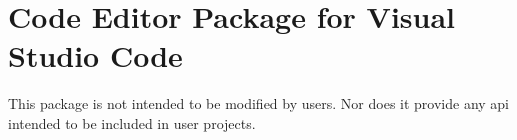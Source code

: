 \chapter{Code Editor Package for Visual Studio Code}
\hypertarget{md__library_2_package_cache_2com_8unity_8ide_8vscode_0d1_82_85_2_documentation_0i_2_r_e_a_d_m_e}{}\label{md__library_2_package_cache_2com_8unity_8ide_8vscode_0d1_82_85_2_documentation_0i_2_r_e_a_d_m_e}
\label{md__library_2_package_cache_2com_8unity_8ide_8vscode_0d1_82_85_2_documentation_0i_2_r_e_a_d_m_e_autotoc_md336}%
%
 This package is not intended to be modified by users. Nor does it provide any api intended to be included in user projects. 